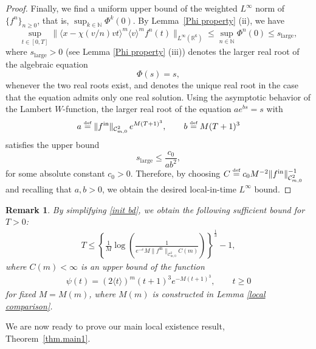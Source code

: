 \documentclass[reqno,11pt,final]{amsart}
\theoremstyle{plain}
\newtheorem{remark}[theorem]{Remark}
\numberwithin{equation}{section}
\numberwithin{theorem}{section}
\newcommand{\eqdef }{\overset{\mbox{\tiny{def}}}{=}}
\begin{document}
\begin{proof}
Finally, we find a uniform upper bound of the weighted $L^\infty$ norm of $\{f^n\}_{n\ge0}$, that is, $\sup_{k\in\mathbb{N}} \Phi^k(0)$.
By Lemma~\ref{Phi property} (ii), we have
$$
\sup_{t\in[0,T]}\|\langle x-\chi(v/n)vt\rangle^m\langle v\rangle^mf^n(t)\|_{L^\infty(\mathbb{R}^6)}
\le \sup_{n\in\mathbb{N}}\Phi^n(0)
\le s_{\mathrm{large}},
$$
where $s_{\mathrm{large}}>0$ (see Lemma \ref{Phi property} (iii)) denotes the larger real root of the algebraic
equation
$$
\Phi(s) = s,
$$whenever the two real roots exist, and denotes the unique real root in the case that the equation admits only one real solution.
Using the asymptotic behavior of the Lambert $W$-function, the larger real
root of the equation $a e^{b s} = s$ with
$$
a \eqdef \|f^{\mathrm{in}}\|_{\mathcal{C}^2_{m,0}}\, e^{M(T+1)^3}, 
\qquad b \eqdef M(T+1)^3
$$ satisfies the upper bound
$$
s_{\mathrm{large}} \le \frac{c_0}{a b^2},
$$for some absolute constant $c_0>0$. 
Therefore, by choosing $C \eqdef c_0M^{-2}\|f^\textup{in}\|^{-1}_{\mathcal{C}^2_{m,0}}$ and recalling that $a,b>0$, we obtain
the desired local-in-time $L^\infty$ bound.
\end{proof}

\begin{remark}\label{T bd}
    By simplifying \eqref{init bd}, we obtain the following sufficient bound for $T>0$:
\begin{align*}
    T \le 
    \left\{
        \frac{1}{M}
        \log\!\left(
            \frac{1}{
                e^{-e}M
                \|f^{\mathrm{in}}\|_{\mathcal{C}^2_{m,0}}C(m)
            }
        \right)
    \right\}^{\!\frac{1}{3}}
    - 1,
\end{align*}
where $C(m)<\infty$ is an upper bound of the function
\begin{align}\label{C const w.r.t. m}
    \psi(t) = (2\langle t\rangle)^m(t+1)^3 e^{-M(t+1)^3}, \qquad t\ge0
\end{align}for fixed $M=M(m)$, where $M(m)$ is constructed in Lemma \ref{local comparison}.
\end{remark}

We are now ready to prove our main local existence result, Theorem~\ref{thm.main1}.
\end{document}
